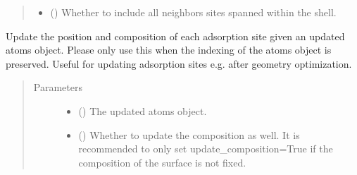 \documentclass[letterpaper,10pt,english]{sphinxmanual}
\begin{document}
\begin{fulllineitems}
\begin{fulllineitems}
\begin{quote}
\begin{description}
\begin{itemize}
\item {} 
 (\sphinxstyleliteralemphasis{\sphinxupquote{, }}) \textendash{} Whether to include all neighbors sites spanned within
the shell.

\end{itemize}

\end{description}\end{quote}

\end{fulllineitems}


\begin{fulllineitems}
\label{\detokenize{modules:acat.adsorption_sites.ClusterAdsorptionSites.update}}
Update the position and composition of each adsorption site
given an updated atoms object. Please only use this when the
indexing of the atoms object is preserved. Useful for updating
adsorption sites e.g. after geometry optimization.
\begin{quote}\begin{description}
\item[{Parameters}] \leavevmode\begin{itemize}
\item {} 
 () \textendash{} The updated atoms object.

\item {} 
 (\sphinxstyleliteralemphasis{\sphinxupquote{, }}) \textendash{} Whether to update the composition as well. It is recommended
to only set update\_composition=True if the composition of
the surface is not fixed.

\end{itemize}

\end{description}\end{quote}

\end{fulllineitems}


\end{fulllineitems}
\end{document}

